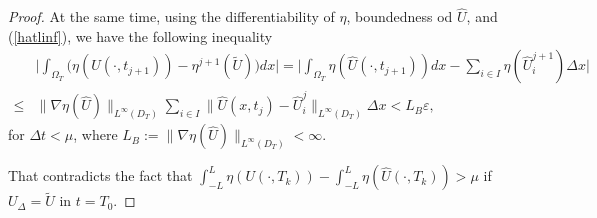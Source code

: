\documentclass[10pt,a4paper]{amsart}
\begin{document}
\begin{proof}
At the same time, using the differentiability of $\eta$, 
boundedness od $\widehat{U}$, and (\ref{hatlinf}), we have the following
inequality
\[
\begin{split}
& \Big| \int_{\Omega_{T}} \Big(\eta(\widehat{U}(\cdot,t_{j+1}))
- \eta^{j+1}(\widetilde{U})\Big) dx \Big| 
= \Big| \int_{\Omega_{T}}\eta(\widehat{U}(\cdot,t_{j+1}))dx 
- \sum_{i\in I}\eta(\widehat{U}_{i}^{j+1})\Delta x \Big| \\
\leq & \|\nabla \eta (\widehat{U})\|_{L^{\infty}(D_{T})}
\sum_{i\in I} \|\widehat{U}(x,t_{j})-\widehat{U}_{i}^{j}\|_{L^{\infty}(D_{T})} \Delta x
< L_{B}\varepsilon,
\end{split}
\]  
for $\Delta t<\mu$, where $L_{B}:=\|\nabla \eta (\widehat{U})\|_{L^{\infty}(D_{T})}
<\infty$.

That contradicts the fact that $\int_{-L}^{L} \eta(U(\cdot,T_{k})) 
- \int_{-L}^{L} \eta(\widehat{U}(\cdot,T_{k}))>\mu$ if $U_{\Delta}=\widetilde{U}$ in $t=T_{0}$.
\end{proof}
\end{document}

